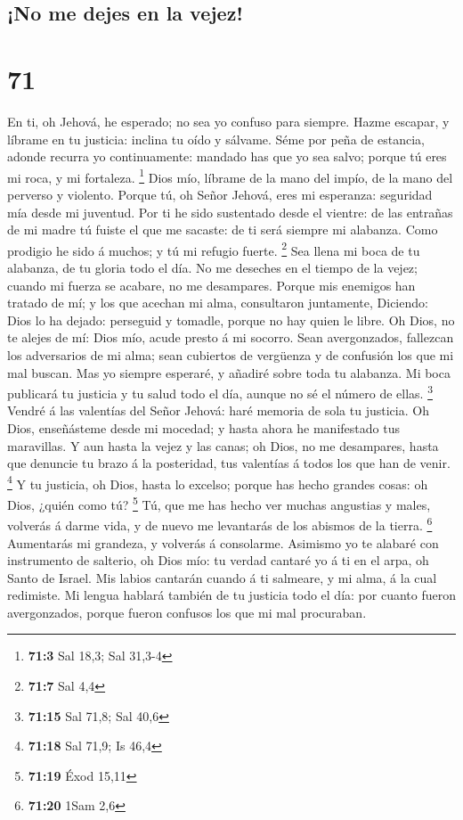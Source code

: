 \hypertarget{no-me-dejes-en-la-vejez}{%
\subsection{¡No me dejes en la vejez!}\label{no-me-dejes-en-la-vejez}}

\hypertarget{section-70}{%
\section{71}\label{section-70}}

 En ti, oh Jehová, he esperado; no sea yo confuso para
siempre.  Hazme escapar, y líbrame en tu justicia: inclina
tu oído y sálvame.  Séme por peña de estancia, adonde
recurra yo continuamente: mandado has que yo sea salvo; porque tú eres
mi roca, y mi fortaleza. \footnote{\textbf{71:3} Sal 18,3; Sal 31,3-4}
 Dios mío, líbrame de la mano del impío, de la mano del
perverso y violento.  Porque tú, oh Señor Jehová, eres mi
esperanza: seguridad mía desde mi juventud.  Por ti he sido
sustentado desde el vientre: de las entrañas de mi madre tú fuiste el
que me sacaste: de ti será siempre mi alabanza.  Como
prodigio he sido á muchos; y tú mi refugio fuerte. \footnote{\textbf{71:7}
  Sal 4,4}  Sea llena mi boca de tu alabanza, de tu gloria
todo el día.  No me deseches en el tiempo de la vejez;
cuando mi fuerza se acabare, no me desampares.  Porque mis
enemigos han tratado de mí; y los que acechan mi alma, consultaron
juntamente,  Diciendo: Dios lo ha dejado: perseguid y
tomadle, porque no hay quien le libre.  Oh Dios, no te
alejes de mí: Dios mío, acude presto á mi socorro.  Sean
avergonzados, fallezcan los adversarios de mi alma; sean cubiertos de
vergüenza y de confusión los que mi mal buscan.  Mas yo
siempre esperaré, y añadiré sobre toda tu alabanza.  Mi
boca publicará tu justicia y tu salud todo el día, aunque no sé el
número de ellas. \footnote{\textbf{71:15} Sal 71,8; Sal 40,6}
 Vendré á las valentías del Señor Jehová: haré memoria de
sola tu justicia.  Oh Dios, enseñásteme desde mi mocedad; y
hasta ahora he manifestado tus maravillas.  Y aun hasta la
vejez y las canas; oh Dios, no me desampares, hasta que denuncie tu
brazo á la posteridad, tus valentías á todos los que han de venir.
\footnote{\textbf{71:18} Sal 71,9; Is 46,4}  Y tu justicia,
oh Dios, hasta lo excelso; porque has hecho grandes cosas: oh Dios,
¿quién como tú? \footnote{\textbf{71:19} Éxod 15,11}  Tú,
que me has hecho ver muchas angustias y males, volverás á darme vida, y
de nuevo me levantarás de los abismos de la tierra. \footnote{\textbf{71:20}
  1Sam 2,6}  Aumentarás mi grandeza, y volverás á
consolarme.  Asimismo yo te alabaré con instrumento de
salterio, oh Dios mío: tu verdad cantaré yo á ti en el arpa, oh Santo de
Israel.  Mis labios cantarán cuando á ti salmeare, y mi
alma, á la cual redimiste.  Mi lengua hablará también de tu
justicia todo el día: por cuanto fueron avergonzados, porque fueron
confusos los que mi mal procuraban.

